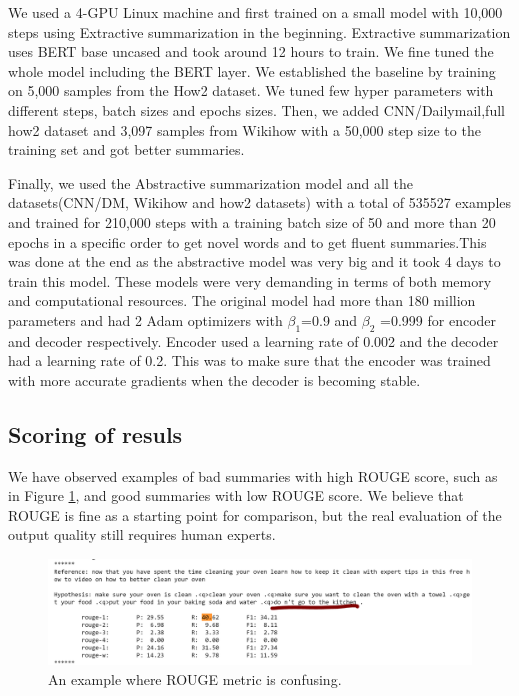 \documentclass{article}
\begin{document}
We used a 4-GPU Linux machine and first trained on a small model with 10,000 steps using Extractive summarization in the beginning. Extractive summarization uses BERT base uncased and took around 12 hours to train. We fine tuned the whole model including the BERT layer. We established the baseline by training on 5,000 samples from the How2 dataset. We tuned few hyper parameters with different steps, batch sizes and epochs sizes. Then, we added CNN/Dailymail,full how2 dataset and 3,097 samples from Wikihow with a 50,000 step size to the training set and got better summaries. 

Finally, we used the Abstractive summarization model and all the datasets(CNN/DM, Wikihow and how2 datasets) with a total of 535527 examples and trained for 210,000 steps with a training batch size of 50 and more than 20 epochs in a specific order to get novel words and to get fluent summaries.This was done at the end as the abstractive model was very big and it took 4 days to train this model. These models were very demanding in terms of both memory and computational resources. The original model had more than 180 million parameters and had 2 Adam optimizers with $\beta_1$=0.9 and $\beta_2$ =0.999 for encoder and decoder respectively. Encoder used a learning rate of 0.002 and the decoder had a learning rate of 0.2. This was to make sure that the encoder was trained with more accurate gradients when the decoder is becoming stable.

\subsection{Scoring of resuls}
\label{Scoring}
We have observed examples of bad summaries with high ROUGE score, such as in Figure \ref{fig:funnysummary}, and good summaries with low ROUGE score. We believe that ROUGE is fine as a starting point for comparison, but the real evaluation of the output quality still requires human experts.

\begin{figure}[H]
  \includegraphics[width=\linewidth]{pic1.png}
  \caption{An example where ROUGE metric is confusing.}
  \label{fig:funnysummary}
\end{figure}
\end{document}
